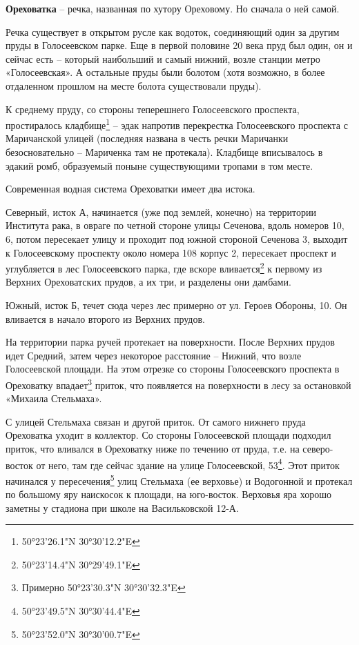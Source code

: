 \medskip

\textbf{Ореховатка} – речка, названная по хутору Ореховому. Но сначала о ней самой.

Речка существует в открытом русле как водоток, соединяющий один за другим пруды в Голосеевском парке. Еще в первой половине 20 века пруд был один, он и сейчас есть – который наибольший и самый нижний, возле станции метро «Голосеевская». А остальные пруды были болотом (хотя возможно, в более отдаленном прошлом на месте болота существовали пруды).

К среднему пруду, со стороны теперешнего Голосеевского проспекта, простиралось кладбище\footnote{50°23'26.1"N 30°30'12.2"E} – эдак напротив перекрестка Голосеевского проспекта с Маричанской улицей (последняя названа в честь речки Маричанки безосновательно – Мариченка там не протекала). Кладбище вписывалось в эдакий ромб, образуемый поныне существующими тропами в том месте.

Современная водная система Ореховатки имеет два истока.

Северный, исток А, начинается (уже под землей, конечно) на территории Института рака, в овраге по четной стороне улицы Сеченова, вдоль номеров 10, 6, потом пересекает улицу и проходит под южной стороной Сеченова 3, выходит к Голосеевскому проспекту около номера 108 корпус 2, пересекает проспект и углубляется в лес Голосеевского парка, где вскоре вливается\footnote{50°23'14.4"N 30°29'49.1"E} к первому из Верхних Ореховатских прудов, а их три, и разделены они дамбами.

Южный, исток Б, течет сюда через лес примерно от ул. Героев Обороны, 10. Он вливается в начало второго из Верхних прудов.

На территории парка ручей протекает на поверхности. После Верхних прудов идет Средний, затем через некоторое расстояние – Нижний, что возле Голосеевской площади. На этом отрезке со стороны Голосеевского проспекта в Ореховатку впадает\footnote{Примерно 50°23'30.3"N 30°30'32.3"E} приток, что появляется на поверхности в лесу за остановкой «Михаила Стельмаха». 

С улицей Стельмаха связан и другой приток. 
От самого нижнего пруда Ореховатка уходит в коллектор. Со стороны Голосеевской площади подходил приток, что вливался в Ореховатку ниже по течению от пруда, т.е. на северо-восток от него, там где сейчас здание на улице Голосеевской, 53\footnote{50°23'49.5"N 30°30'44.4"E}. Этот приток начинался у пересечения\footnote{50°23'52.0"N 30°30'00.7"E} улиц Стельмаха (ее верховье) и Водогонной и протекал по большому яру наискосок к площади, на юго-восток. Верховья яра хорошо заметны у стадиона при школе на Васильковской 12-А.

